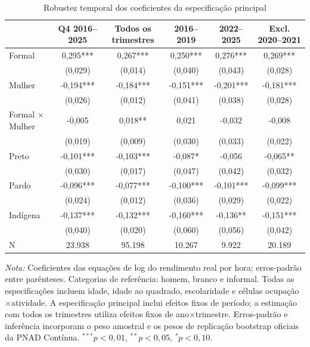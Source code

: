 \documentclass[12pt]{article}
\begin{document}
\begin{table}[htbp]
\centering
\caption{Robustez temporal dos coeficientes da especificação principal}
\label{tab:robustez_temporal}
\scriptsize
\begin{tabular}{lccccc}
\toprule
 & Q4 2016--2025
 & Todos os trimestres
 & 2016--2019
 & 2022--2025
 & Excl. 2020--2021 \\
\midrule

Formal
& 0,295***
& 0,267***
& 0,250***
& 0,276***
& 0,269*** \\
&(0,029)
&(0,014)
&(0,040)
&(0,043)
&(0,028) \\[0.3em]

Mulher
& -0,194***
& -0,184***
& -0,151***
& -0,201***
& -0,181*** \\
&(0,026)
&(0,012)
&(0,041)
&(0,038)
&(0,028) \\[0.3em]

Formal $\times$ Mulher
& -0,005
& 0,018**
& 0,021
& -0,032
& -0,008 \\
&(0,019)
&(0,009)
&(0,030)
&(0,033)
&(0,022) \\[0.3em]

Preto
& -0,101***
& -0,103***
& -0,087*
& -0,056
& -0,065** \\
&(0,030)
&(0,017)
&(0,047)
&(0,042)
&(0,032) \\[0.3em]

Pardo
& -0,096***
& -0,077***
& -0,100***
& -0,101***
& -0,099*** \\
&(0,024)
&(0,012)
&(0,036)
&(0,029)
&(0,022) \\[0.3em]

Indígena
& -0,137***
& -0,132***
& -0,160***
& -0,136**
& -0,151*** \\
&(0,040)
&(0,020)
&(0,060)
&(0,056)
&(0,042) \\

\midrule
N
& 23.938
& 95.198
& 10.267
& 9.922
& 20.189 \\
\bottomrule
\end{tabular}

\vspace{0.15cm}
\begin{minipage}{0.97\textwidth}
\scriptsize
\textit{Nota:} Coeficientes das equações de log do rendimento real por hora;
erros-padrão entre parênteses. Categorias de referência: homem, branco e
informal. Todas as especificações
incluem idade, idade ao quadrado, escolaridade e células
ocupação$\times$atividade. A especificação principal inclui efeitos fixos de
período; a estimação com todos os trimestres utiliza efeitos fixos de
ano$\times$trimestre. Erros-padrão e inferência incorporam o peso amostral e
os pesos de replicação bootstrap oficiais da PNAD Contínua.
$^{***}p<0,01$, $^{**}p<0,05$, $^{*}p<0,10$.
\end{minipage}
\end{table}
\end{document}
